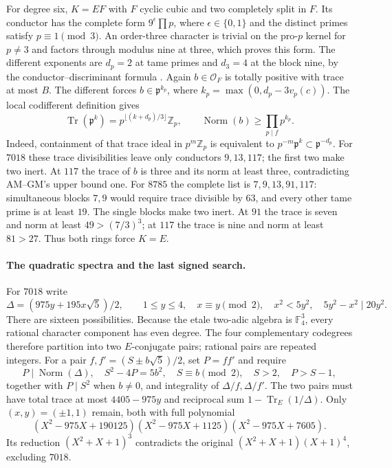 For degree six, $K=EF$ with $F$ cyclic cubic and two completely split
in $F$. Its conductor has the complete form
$9^\epsilon\prod p$, where $\epsilon\in\{0,1\}$ and the distinct
primes satisfy $p\equiv1\pmod3$. An order-three character is trivial
on the pro-$p$ kernel for $p\ne3$ and factors through modulus nine at
three, which proves this form. The different exponents are $d_p=2$
at tame primes and $d_3=4$ at the block nine, by the
conductor--discriminant formula \cite[Chapter~V, Theorem~3.27]{MilneCFT}.
Again $b\in\mathcal O_F$ is totally positive with trace at most $B$.
The different forces $b\in\mathfrak p^{k_p}$, where
$k_p=\max(0,d_p-3v_p(c))$. The local codifferent definition gives
\[
 \operatorname{Tr}(\mathfrak p^k)
 =p^{\lfloor(k+d_p)/3\rfloor}\mathbb Z_p,
 \qquad
 \operatorname{Norm}(b)\ge\prod_{p\mid f}p^{k_p}.
\]
Indeed, containment of that trace ideal in $p^m\mathbb Z_p$ is
equivalent to $p^{-m}\mathfrak p^k\subset\mathfrak p^{-d_p}$.
For $7018$ these trace divisibilities leave only conductors $9,13,117$;
the first two make two inert. At $117$ the trace of $b$ is three and
its norm at least three, contradicting AM--GM's upper bound one.
For $8785$ the complete list is $7,9,13,91,117$: simultaneous blocks
$7,9$ would require trace divisible by $63$, and every other tame prime
is at least $19$. The single blocks make two inert. At $91$ the trace
is seven and norm at least $49>(7/3)^3$; at $117$ the trace is nine
and norm at least $81>27$. Thus both rings force $K=E$.

\paragraph{The quadratic spectra and the last signed search.}
For $7018$ write
\[
 \Delta=(975y+195x\sqrt5)/2,\qquad
 1\le y\le4,\quad x\equiv y\pmod2,\quad x^2<5y^2,
 \quad 5y^2-x^2\mid20y^2.
\]
There are sixteen possibilities. Because the etale two-adic algebra is
$\mathbb F_4^3$, every rational character component has even degree.
The four complementary codegrees therefore partition into two
$E$-conjugate pairs; rational pairs are repeated integers.
For a pair $f,f'=(S\pm b\sqrt5)/2$, set $P=ff'$ and require
\[
 P\mid\operatorname{Norm}(\Delta),\quad S^2-4P=5b^2,\quad
 S\equiv b\pmod2,\quad S>2,\quad P>S-1,
\]
together with $P\mid S^2$ when $b\ne0$, and integrality of
$\Delta/f,\Delta/f'$. The two pairs must have total trace at most
$4405-975y$ and reciprocal sum $1-\operatorname{Tr}_E(1/\Delta)$.
Only $(x,y)=(\pm1,1)$ remain, both with full polynomial
\[
 (X^2-975X+190125)(X^2-975X+1125)(X^2-975X+7605).
\]
Its reduction $(X^2+X+1)^3$ contradicts the original
$(X^2+X+1)(X+1)^4$, excluding $7018$.

